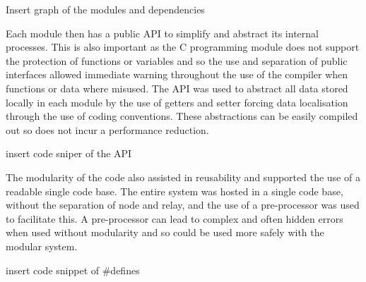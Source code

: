 {Insert graph of the modules and dependencies}


Each module then has a public API to simplify and abstract its internal processes. This is also
important as the C programming module does not support the protection of functions or variables
and so the use and separation of public interfaces allowed immediate warning throughout the use of
the compiler when functions or data where misused. The API was used to abstract all data stored
locally in each module by the use of getters and setter forcing data localisation through the use of
coding conventions. These abstractions can be easily compiled out so does not incur a performance
reduction.


{insert code sniper of the API}


The modularity of the code also assisted in reusability and supported the use of a readable single
code base. The entire system was hosted in a single code base, without the separation of node and
relay, and the use of a pre-processor was used to facilitate this. A pre-processor can lead to complex
and often hidden errors when used without modularity and so could be used more safely with the
modular system.


{insert code snippet of \#defines}


